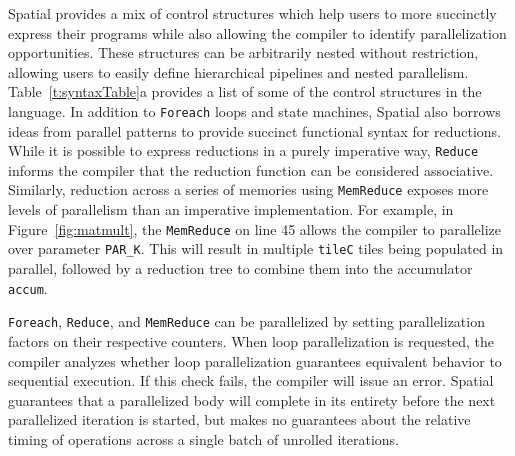 Spatial provides a mix of control structures which help users to more succinctly express their programs while also allowing the compiler to identify parallelization opportunities.
These structures can be arbitrarily nested without restriction, allowing users to easily define hierarchical pipelines and nested parallelism. Table~\ref{t:syntaxTable}a provides a list of some of the control structures in the language. In addition to \texttt{\small{Foreach}} loops and state machines, Spatial also borrows ideas
from parallel patterns \cite{delite-tecs14, pldi13halide} to provide succinct functional syntax for reductions.
While it is possible to express
reductions in a purely imperative way, \texttt{\small{Reduce}} informs the compiler that the
reduction function can be considered associative.
Similarly, reduction across a series of memories using \texttt{\small{MemReduce}} exposes more levels of parallelism than an imperative implementation.
For example, in Figure~\ref{fig:matmult}, the \texttt{\small{MemReduce}} on line 45 allows the compiler to parallelize over parameter \texttt{\small{PAR\_K}}. This will result in multiple \texttt{\small{tileC}} tiles being populated in parallel, followed by a reduction tree to combine them into the accumulator \texttt{\small{accum}}.

\texttt{\small{Foreach}}, \texttt{\small{Reduce}}, and \texttt{\small{MemReduce}} can be parallelized by setting parallelization factors on their respective counters.
When loop parallelization is requested, the compiler analyzes whether
loop parallelization guarantees equivalent behavior to sequential execution.
If this check fails, the compiler will issue an error.
Spatial guarantees that a parallelized body will complete in its entirety before the next parallelized iteration is started, but makes no guarantees about the relative timing of operations across a single batch of unrolled iterations.


